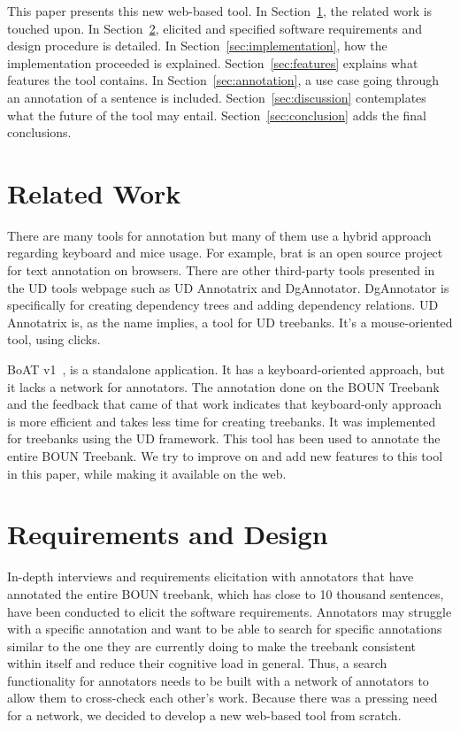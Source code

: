 \documentclass[
]{ceurart}
\begin{document}
This paper presents this new web-based tool.
In Section~\ref{sec:related}, the related work is touched upon.
In Section~\ref{sec:requirements}, elicited and specified software requirements and design procedure is detailed.
In Section~\ref{sec:implementation}, how the implementation proceeded is explained.
Section~\ref{sec:features} explains what features the tool contains.
In Section~\ref{sec:annotation}, a use case going through an annotation of a sentence is included.
Section~\ref{sec:discussion} contemplates what the future of the tool may entail.
Section~\ref{sec:conclusion} adds the final conclusions.

\section{Related Work}
\label{sec:related}

There are many tools for annotation but many of them use a hybrid approach regarding keyboard and mice usage.
For example, brat is an open source project for text annotation on browsers.\cite{brat}\cite{UD}
There are other third-party tools presented in the UD tools webpage such as UD Annotatrix\cite{tyers-etal:2018} and DgAnnotator\cite{dgannotator}.
DgAnnotator is specifically for creating dependency trees and adding dependency relations.
UD Annotatrix is, as the name implies, a tool for UD treebanks.
It's a mouse-oriented tool, using clicks.

BoAT v1~\cite{turk-etal-2019-turkish}, is a standalone application.
It has a keyboard-oriented approach, but it lacks a network for annotators.
The annotation done on the BOUN Treebank and the feedback that came of that work indicates that keyboard-only approach is more efficient and takes less time for creating treebanks.
It was implemented for treebanks using the UD framework.
This tool has been used to annotate the entire BOUN Treebank.
We try to improve on and add new features to this tool in this paper, while making it available on the web.

\section{Requirements and Design}
\label{sec:requirements}

In-depth interviews and requirements elicitation with annotators that have annotated the entire BOUN treebank, which has close to 10 thousand sentences, have been conducted to elicit the software requirements.
Annotators may struggle with a specific annotation and want to be able to search for specific annotations similar to the one they are currently doing to make the treebank consistent within itself and reduce their cognitive load in general.
Thus, a search functionality for annotators needs to be built with a network of annotators to allow them to cross-check each other's work.
Because there was a pressing need for a network, we decided to develop a new web-based tool from scratch.
\end{document}
